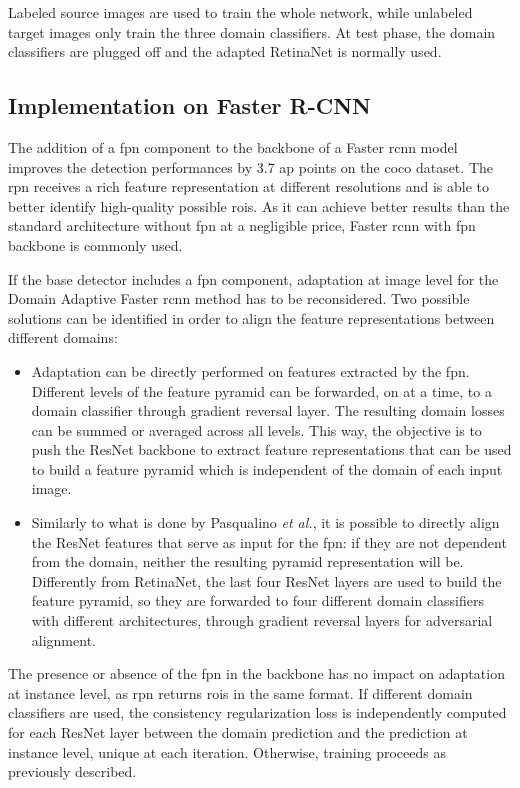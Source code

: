 \documentclass[%
    corpo=12pt,
    twoside,
    stile=classica,   
    tipotesi=magistrale,
    evenboxes,
    english,
	numerazioneromana,
]{toptesi}
\begin{document}

Labeled source images are used to train the whole network, while unlabeled target images only train the three domain classifiers. At test phase, the domain classifiers are plugged off and the adapted RetinaNet is normally used.

\subsection{Implementation on Faster R-CNN}
The addition of a \gls{fpn} component to the backbone of a Faster \gls{rcnn} model improves the detection performances by 3.7 \gls{ap} points on the \gls{coco} dataset\cite{lin2017feature}. The \gls{rpn} receives a rich feature representation at different resolutions and is able to better identify high-quality possible \glspl{roi}. As it can achieve better results than the standard architecture without \gls{fpn} at a negligible price, Faster \gls{rcnn} with \gls{fpn} backbone is commonly used. 

If the base detector includes a \gls{fpn} component, adaptation at image level for the Domain Adaptive Faster \gls{rcnn} method has to be reconsidered. Two possible solutions can be identified in order to align the feature representations between different domains:
\begin{itemize}
	\item Adaptation can be directly performed on features extracted by the \gls{fpn}. Different levels of the feature pyramid can be forwarded, on at a time, to a domain classifier through gradient reversal layer. The resulting domain losses can be summed or averaged across all levels. This way, the objective is to push the ResNet backbone to extract feature representations that can be used to build a feature pyramid which is independent of the domain of each input image.
	\item Similarly to what is done by Pasqualino \textit{et al.}\cite{pasqualino2020unsupervised}, it is possible to directly align the ResNet features that serve as input for the \gls{fpn}: if they are not dependent from the domain, neither the resulting pyramid representation will be. Differently from RetinaNet, the last four ResNet layers are used to build the feature pyramid, so they are forwarded to four different domain classifiers with different architectures, through gradient reversal layers for adversarial alignment.
\end{itemize}
The presence or absence of the \gls{fpn} in the backbone has no impact on adaptation at instance level, as \gls{rpn} returns \glspl{roi} in the same format. If different domain classifiers are used, the consistency regularization loss is independently computed for each ResNet layer between the domain prediction and the prediction at instance level, unique at each iteration. Otherwise, training proceeds as previously described.
\end{document}
